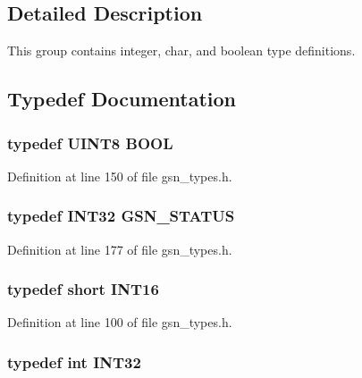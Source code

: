 \subsection{Detailed Description}
This group contains integer, char, and boolean type definitions. 

\subsection{Typedef Documentation}
\hypertarget{a00660_ga1f04022c0a182c51c059438790ea138c}{
\subsubsection[{BOOL}]{\setlength{\rightskip}{0pt plus 5cm}typedef {\bf UINT8} {\bf BOOL}}}
\label{a00660_ga1f04022c0a182c51c059438790ea138c}


Definition at line 150 of file gsn\_\-types.h.

\hypertarget{a00660_gada5951904ac6110b1fa95e51a9ddc217}{
\subsubsection[{GSN\_\-STATUS}]{\setlength{\rightskip}{0pt plus 5cm}typedef {\bf INT32} {\bf GSN\_\-STATUS}}}
\label{a00660_gada5951904ac6110b1fa95e51a9ddc217}


Definition at line 177 of file gsn\_\-types.h.

\hypertarget{a00660_ga57de7cb8e702b1746127a4d5137fa455}{
\subsubsection[{INT16}]{\setlength{\rightskip}{0pt plus 5cm}typedef short {\bf INT16}}}
\label{a00660_ga57de7cb8e702b1746127a4d5137fa455}


Definition at line 100 of file gsn\_\-types.h.

\hypertarget{a00660_ga63021d67d54286c2163bcdb43a6f2569}{
\subsubsection[{INT32}]{\setlength{\rightskip}{0pt plus 5cm}typedef int {\bf INT32}}}
\label{a00660_ga63021d67d54286c2163bcdb43a6f2569}



